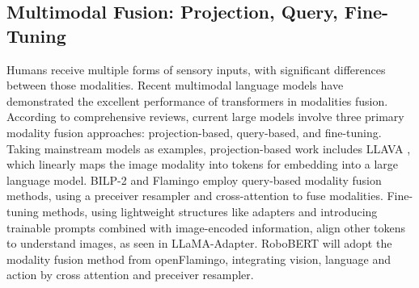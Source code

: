 \subsection{Multimodal Fusion: Projection, Query, Fine-Tuning}
Humans receive multiple forms of sensory inputs, with significant differences between those modalities. Recent multimodal language models have demonstrated the excellent performance of transformers in modalities fusion. According to comprehensive reviews, current large models involve three primary modality fusion approaches: projection-based, query-based, and fine-tuning. Taking mainstream models\cite{A14}\cite{A14-2} as examples, projection-based work includes LLAVA \cite{A15}, which linearly maps the image modality into tokens for embedding into a large language model. BILP-2\cite{A16} and Flamingo\cite{A17} employ query-based modality fusion methods, using a preceiver resampler and cross-attention to fuse modalities. Fine-tuning methods, using lightweight structures like adapters and introducing trainable prompts combined with image-encoded information, align other tokens to understand images, as seen in LLaMA-Adapter\cite{A22}. RoboBERT  will adopt the modality fusion method from openFlamingo, integrating vision, language and action by cross attention and preceiver resampler.